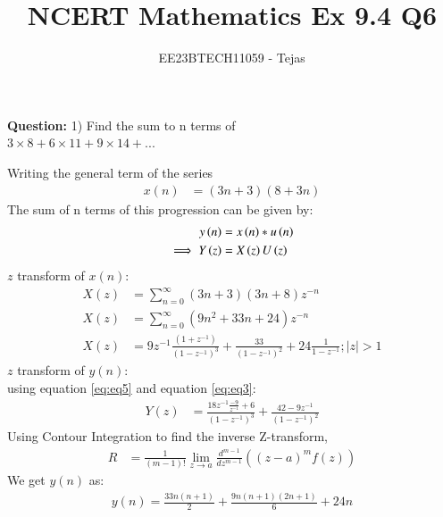 \documentclass[journal,12pt,twocolumn]{IEEEtran}
\theoremstyle{remark}
\begin{document}

\vspace{3cm}

\title{NCERT Mathematics Ex 9.4 Q6}
\author{EE23BTECH11059 - Tejas$^{}$%
}
\maketitle
\newpage
\textbf{Question:}
1) Find the sum to n terms of\\$3 \times 8 + 6 \times 11 + 9 \times 14 + ...$
        

    
    \solution
        
        Writing the general term of the series
        \begin{align}
            x(n)&=(3n+3)(8+3n)  
        \end{align}
        The sum of n terms of this progression can be given by:
        \begin{align}
    y\left(n\right) &= x\left(n\right)*u\left(n\right)\\
    \implies  Y\left(z\right) &= X\left(z\right)U\left(z\right) \label{eq:eq3}
\end{align}
$z$ transform of $x(n)$:
        \begin{align}
            X(z) &= \sum_{n=0}^{\infty} (3n+3)(3n+8)z^{-n} \\
            X(z) &= \sum_{n=0}^{\infty} (9n^2 +33n+24)z^{-n} \\
            X(z)&=9z^{-1}\frac{(1+z^{-1})}{(1-z^{-1})^3} + \frac{33}{(1-z^{-1})^2} +24\frac{1}{1-z^{-1}}; |z|>1    \label{eq:eq5}
        \end{align}
        $z$ transform of $y(n)$:\\
        using equation \eqref{eq:eq5} and equation \eqref{eq:eq3}:
        \begin{align}
            Y(z)&= \frac{18z^{-1}\frac{-9}{z^{-1}}+6}{(1-z^{-1})^3} + \frac{42-9z^{-1}}{(1-z^{-1})^2} 
        \end{align}
        Using Contour Integration to find the inverse Z-transform,
        \begin{align}
            R & =\frac{1}{(m-1) !} \lim _{z \rightarrow a} \frac{d^{m-1}}{d z^{m-1}}\left((z-a)^m f(z)\right)
        \end{align}
        We get $y(n)$ as: 
        \begin{align}
            y(n)=\frac{33n(n+1)}{2}+\frac{9n(n+1)(2 n+1)}{6}+24n
        \end{align}
        
\end{document}
